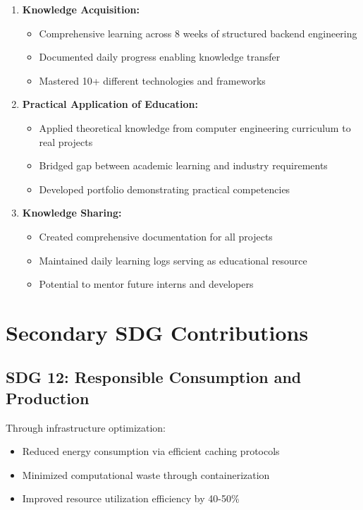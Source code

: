 \begin{enumerate}
    \item \textbf{Knowledge Acquisition:}
    \begin{itemize}
        \item Comprehensive learning across 8 weeks of structured backend engineering
        \item Documented daily progress enabling knowledge transfer
        \item Mastered 10+ different technologies and frameworks
    \end{itemize}
    
    \item \textbf{Practical Application of Education:}
    \begin{itemize}
        \item Applied theoretical knowledge from computer engineering curriculum to real projects
        \item Bridged gap between academic learning and industry requirements
        \item Developed portfolio demonstrating practical competencies
    \end{itemize}
    
    \item \textbf{Knowledge Sharing:}
    \begin{itemize}
        \item Created comprehensive documentation for all projects
        \item Maintained daily learning logs serving as educational resource
        \item Potential to mentor future interns and developers
    \end{itemize}
\end{enumerate}

\section{Secondary SDG Contributions}

\subsection{SDG 12: Responsible Consumption and Production}

Through infrastructure optimization:
\begin{itemize}
    \item Reduced energy consumption via efficient caching protocols
    \item Minimized computational waste through containerization
    \item Improved resource utilization efficiency by 40-50\%
\end{itemize}

